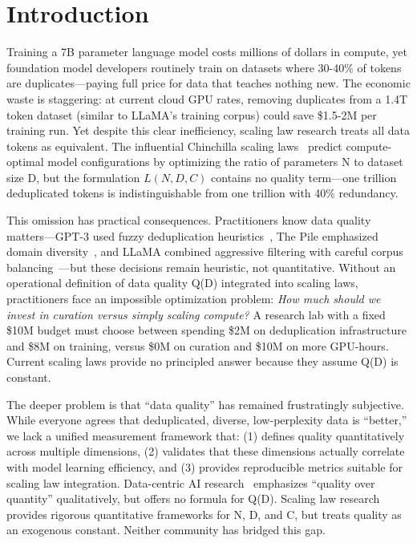 \section{Introduction}

Training a 7B parameter language model costs millions of dollars in compute, yet foundation model developers routinely train on datasets where 30-40\% of tokens are duplicates---paying full price for data that teaches nothing new. The economic waste is staggering: at current cloud GPU rates, removing duplicates from a 1.4T token dataset (similar to LLaMA's training corpus) could save \$1.5-2M per training run. Yet despite this clear inefficiency, scaling law research treats all data tokens as equivalent. The influential Chinchilla scaling laws~\cite{hoffmann2022training} predict compute-optimal model configurations by optimizing the ratio of parameters N to dataset size D, but the formulation $L(N, D, C)$ contains no quality term---one trillion deduplicated tokens is indistinguishable from one trillion with 40\% redundancy.

This omission has practical consequences. Practitioners know data quality matters---GPT-3 used fuzzy deduplication heuristics~\cite{brown2020language}, The Pile emphasized domain diversity~\cite{gao2020pile}, and LLaMA combined aggressive filtering with careful corpus balancing~\cite{touvron2023llama}---but these decisions remain heuristic, not quantitative. Without an operational definition of data quality Q(D) integrated into scaling laws, practitioners face an impossible optimization problem: \textit{How much should we invest in curation versus simply scaling compute?} A research lab with a fixed \$10M budget must choose between spending \$2M on deduplication infrastructure and \$8M on training, versus \$0M on curation and \$10M on more GPU-hours. Current scaling laws provide no principled answer because they assume Q(D) is constant.

The deeper problem is that ``data quality'' has remained frustratingly subjective. While everyone agrees that deduplicated, diverse, low-perplexity data is ``better,'' we lack a unified measurement framework that: (1) defines quality quantitatively across multiple dimensions, (2) validates that these dimensions actually correlate with model learning efficiency, and (3) provides reproducible metrics suitable for scaling law integration. Data-centric AI research~\cite{ng2021data} emphasizes ``quality over quantity'' qualitatively, but offers no formula for Q(D). Scaling law research provides rigorous quantitative frameworks for N, D, and C, but treats quality as an exogenous constant. Neither community has bridged this gap.

